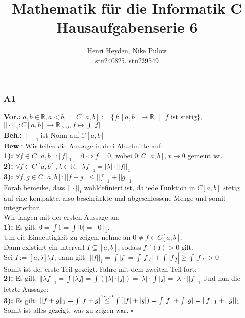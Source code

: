 \documentclass[12pt, a4paper]{article}
\title{Mathematik für die Informatik C\\Hausaufgabenserie 6}
\author{Henri Heyden, Nike Pulow \\ \small stu240825, stu239549}
\date{}
\newcommand*{\qed}{\null\nobreak\hfill\ensuremath{\square}}
\newcommand*{\puffer}{\text{ }\text{ }\text{ }\text{ }}
\newcommand*{\gap}{\text{ }}
\newcommand*{\setDef}{\gap|\gap}
\newcommand*{\vor}{\textbf{Vor.:} \gap}
\newcommand*{\beh}{\textbf{Beh.:} \gap}
\newcommand*{\bew}{\textbf{Bew.:} \gap}
\newcommand*{\R}{\mathbb R}
\newcommand{\dr}{\mathrel{\stackrel{\makebox[0pt]{\mbox{\normalfont\tiny Dreieck.}}}{\le}}}
\begin{document}
\maketitle

\doublespacing
\subsubsection*{A1}
\vor \(a,b \in \R, a < b, \gap \gap C[a,b] := \{f:[a,b] \rightarrow \R \setDef f \text{ ist stetig}\},\) \\
\puffer\puffer\gap\(||\cdot||_1 : C[a,b] \rightarrow \R_{\ge 0}, f \mapsto \int |f|\) \\
\beh \(||\cdot||_1\) ist Norm auf \(C[a,b]\) \\
\bew Wir teilen die Aussage in drei Abschnitte auf: \\
\textbf{1):} \(\forall f \in C[a,b]: ||f||_1 = 0 \Leftrightarrow f = 0\), wobei \(0 : C[a,b], x \mapsto 0\) gemeint ist. \\
\textbf{2):} \(\forall f \in C[a,b], \lambda \in \R: ||\lambda f||_1 = |\lambda| \cdot ||f||_1\) \\
\textbf{3):} \(\forall f,g \in C[a,b]: ||f + g|| \le ||f||_1 + ||g||_1\) \\
Forab bemerke, dass \(||\cdot||_1\) wohldefiniert ist, da jede Funktion in \(C[a,b]\) stetig auf eine kompakte, also beschränkte und abgeschlossene Menge und somit integrierbar. \\
Wir fangen mit der ersten Aussage an: \\
\textbf{1):} Es gilt: \(0 = \int 0 = \int |0| = ||0||_1\).\\
Um die Eindeutigkeit zu zeigen, nehme an \(0 \ne f \in C[a,b]\). \\
Dann existiert ein Intervall \(I \subseteq [a,b]\), sodass \(f^\rightarrow(I) > 0\) gilt.\\
Sei \(\overline{I} := [a,b] \setminus I\), dann gilt:
\(||f||_1 = \int|f| = \int|f_{|I}| + \int|f_{|\overline{I}}| \ge \int|f_{|I}| > 0\) \\
Somit ist der erste Teil gezeigt. Fahre mit dem zweiten Teil fort:\\
\textbf{2):} Es gilt: \(||\lambda f||_1 = \int|\lambda f| = \int \left(|\lambda| \cdot |f|\right) = |\lambda| \cdot \int |f| = |\lambda| \cdot ||f||_1\)
Und nun die letzte Aussage: \\
\textbf{3):} Es gilt: \(||f + g||_1 = \int|f + g| \gap \dr \gap \int\left(|f| + |g|\right) = \int|f| + \int|g| = ||f||_1 + ||g||_1\) \\
Somit ist alles gezeigt, was zu zeigen war. \qed
\pagebreak
\end{document}
